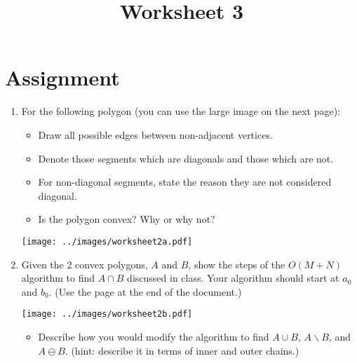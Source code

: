 \documentclass[a4paper,12pt]{article}
\title{Worksheet 3}
\begin{document}
\maketitle

\worksheetGroundRules


\vspace{5pt}
\section{Assignment}

\begin{enumerate}


\item For the following polygon (you can use the large image on the next page):

\begin{minipage}[m]{0.6\textwidth}
\begin{itemize}
\item Draw all possible edges between non-adjacent vertices. 
\item Denote those segments which are diagonals and those which are not. 
\item For non-diagonal segments, state the reason they are not considered diagonal. 
\item Is the polygon convex? Why or why not?
\end{itemize}
\end{minipage}
%
\hfill
%
\begin{minipage}[m]{5.5cm}
\begin{center}
\texttt{[image: ../images/worksheet2a.pdf]}
\end{center}
\end{minipage}




\item Given the 2 convex polygons, $A$ and $B$, show the steps of the $O(M+N)$ algorithm to find $A \cap B$ discussed in class. Your algorithm should start at $a_0$ and $b_0$. (Use the page at the end of the document.)


\begin{center}
\texttt{[image: ../images/worksheet2b.pdf]}
\end{center}

\begin{itemize}
\item Describe how you would modify the algorithm to find $A \cup B$, $A \backslash B$, and $A \ominus B$. (hint: describe it in terms of inner and outer chains.)
\end{itemize}


\end{enumerate}
\end{document}
